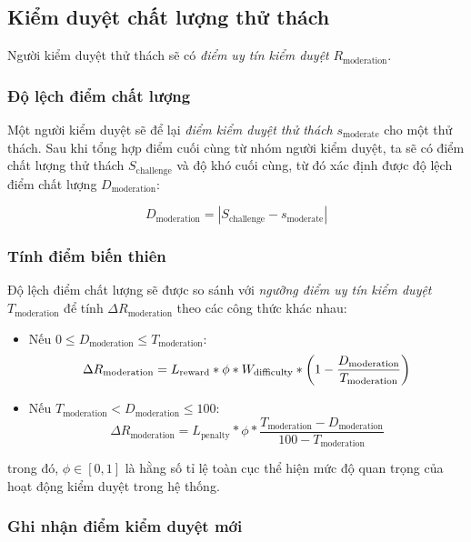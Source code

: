 \subsection{Kiểm duyệt chất lượng thử thách}

Người kiểm duyệt thử thách sẽ có \textit{điểm uy tín kiểm duyệt} $R_{\text{moderation}}$.

\subsubsection{Độ lệch điểm chất lượng}

Một người kiểm duyệt sẽ để lại \textit{điểm kiểm duyệt thử thách} $s_{\text{moderate}}$ cho một thử thách. Sau khi tổng hợp điểm cuối cùng từ nhóm người kiểm duyệt,
ta sẽ có điểm chất lượng thử thách $S_{\text{challenge}}$ và độ khó cuối cùng, từ đó xác định được độ lệch điểm chất lượng $D_{\text{moderation}}$:

\[D_{\text{moderation}}=|S_{\text{challenge}}-s_{\text{moderate}}|\]

\subsubsection{Tính điểm biến thiên}

Độ lệch điểm chất lượng sẽ được so sánh với \textit{ngưỡng điểm uy tín kiểm duyệt} $T_{\text{moderation}}$ để tính $\Delta R_{\text{moderation}}$ theo các công thức khác nhau:

\begin{itemize}
  \item Nếu $0 \leq D_{\text{moderation}} \leq  T_{\text{moderation}}$:
        \[\Delta R_{\text{\text{moderation}}} = L_{\text{reward}}*\phi * W_{\text{difficulty}} * \left(1 - \frac{D_{\text{moderation}}}{T_{\text{moderation}}}\right) \]
  \item Nếu $T_{\text{moderation}} < D_{\text{moderation}} \leq 100$:
        \[\Delta R_{{\text{moderation}}} = L_{\text{penalty}} * \phi * \frac{T_{\text{moderation}} - D_{\text{moderation}}}{100-T_{\text{moderation}}} \]
\end{itemize}
trong đó, $\phi \in [0, 1]$ là hằng số tỉ lệ toàn cục thể hiện mức độ quan trọng của hoạt động kiểm duyệt trong hệ thống.

\subsubsection{Ghi nhận điểm kiểm duyệt mới}

